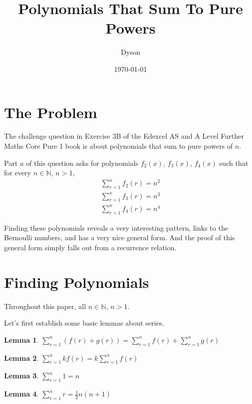 \documentclass[a4paper]{article}
\title{Polynomials That Sum To Pure Powers}
\author{Dyson}
\date{\today}
\newcommand{\sn}{\sum\limits_{r=1}^{n}}
\newcommand{\inn}{\in \mathbb{N}}
\newcommand{\oo}[1]{\frac{1}{#1}}
\newtheorem{lemma}{Lemma}
\begin{document}
\maketitle

\setlength{\parindent}{0em}
\setlength{\parskip}{1em}

\section{The Problem}

The challenge question in Exercise 3B of the Edexcel AS and A Level Further Maths Core Pure 1 book is about polynomials that sum to pure powers of $n$.

Part $a$ of this question asks for polynomials $f_2(x)$, $f_3(x)$, $f_4(x)$ such that for every $n \inn$, $n > 1$,
\begin{gather*}
\sn f_2(r) = n^2\\[0.3em]
\sn f_3(r) = n^3\\[0.3em]
\sn f_4(r) = n^4
\end{gather*}

Finding these polynomials reveals a very interesting pattern, links to the Bernoulli numbers, and has a very nice general form. And the proof of this general form simply falls out from a recurrence relation.

\section{Finding Polynomials}

Throughout this paper, all $n \inn$, $n > 1$.

Let's first establish some basic lemmas about series.

\begin{lemma}
$\displaystyle \sn (f(r) + g(r)) = \sn f(r) + \sn g(r)$
\label{lem:add}
\end{lemma}

\begin{lemma}
$\displaystyle \sn kf(r) = k \sn f(r)$
\label{lem:mult}
\end{lemma}

\begin{lemma}
$\displaystyle \sn 1 = n$
\label{lem:sum_1}
\end{lemma}

\begin{lemma}
$\displaystyle \sn r = \oo{2}n(n + 1)$
\label{lem:sum_r}
\end{lemma}
\end{document}
